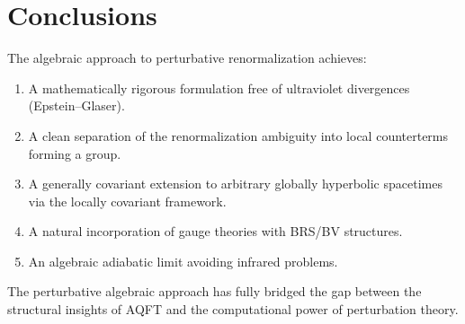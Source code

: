 \documentclass[11pt,a4paper]{article}
\begin{document}
\section{Conclusions}

The algebraic approach to perturbative renormalization achieves:
\begin{enumerate}[nosep]
  \item A mathematically rigorous formulation free of ultraviolet divergences
        (Epstein--Glaser).
  \item A clean separation of the renormalization ambiguity into local
        counterterms forming a group.
  \item A generally covariant extension to arbitrary globally hyperbolic
        spacetimes via the locally covariant framework.
  \item A natural incorporation of gauge theories with BRS/BV structures.
  \item An algebraic adiabatic limit avoiding infrared problems.
\end{enumerate}

The perturbative algebraic approach has fully bridged the gap between
the structural insights of AQFT and the computational power of perturbation
theory.
\end{document}
